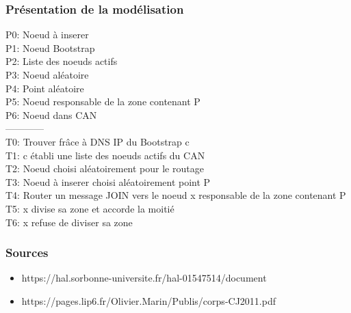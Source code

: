 \documentclass[french]{beamer}
\begin{document}
 \begin{frame}
  \frametitle{Présentation de la modélisation}
  P0: Noeud à inserer\\
  P1: Noeud Bootstrap\\
  P2: Liste des noeuds actifs\\
  P3: Noeud aléatoire\\
  P4: Point aléatoire\\
  P5: Noeud responsable de la zone contenant P\\
  P6: Noeud dans CAN\\
  ------------ \\
  T0: Trouver frâce à DNS IP du Bootstrap c\\
  T1: c établi une liste des noeuds actifs du CAN\\
  T2: Noeud choisi aléatoirement pour le routage\\
  T3: Noeud à inserer choisi aléatoirement point P\\
  T4: Router un message JOIN vers le noeud x responsable de la zone contenant P\\
  T5: x divise sa zone et accorde la moitié\\
  T6: x refuse de diviser sa zone

 
\end{frame}

\begin{frame}
  \frametitle{Sources}
  
  \begin{itemize}
    \item  https://hal.sorbonne-universite.fr/hal-01547514/document
    
    \item https://pages.lip6.fr/Olivier.Marin/Publis/corps-CJ2011.pdf

    \end{itemize}
  
\end{frame}
\end{document}
